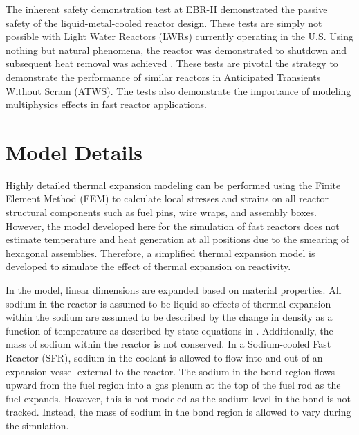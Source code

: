   The inherent safety demonstration test at EBR-II demonstrated the passive
  safety of the liquid-metal-cooled reactor design. These tests are simply not 
  possible with Light Water Reactors (LWRs) currently operating in the U.S. 
  Using nothing but natural phenomena, the reactor was demonstrated to shutdown 
  and subsequent heat removal was achieved \cite{ebriitests}. These tests are 
  pivotal the strategy to demonstrate the performance of similar reactors in 
  Anticipated Transients Without Scram (ATWS). The tests also demonstrate the 
  importance of modeling multiphysics effects in fast reactor applications.

\section{Model Details}
  \label{sec:model_details}
  Highly detailed thermal expansion modeling can be performed using the Finite
  Element Method (FEM) to calculate local stresses and strains on all reactor
  structural components such as fuel pins, wire wraps, and assembly boxes. 
  However, the model developed here for the simulation of
  fast reactors does not estimate temperature and heat generation at all 
  positions due to the smearing of hexagonal assemblies. Therefore, a simplified 
  thermal expansion model is developed to simulate the effect of thermal 
  expansion on reactivity.

  In the model, linear dimensions are expanded based on material properties.
  All sodium in the reactor is assumed to be liquid so effects of thermal
  expansion within the sodium are assumed to be described by the change in
  density as a function of temperature as described by state equations in
  \cite{sodiumProp}. Additionally, the mass of sodium within the reactor is not
  conserved. In a Sodium-cooled Fast Reactor (SFR), sodium in the coolant is 
  allowed to flow into and out of an expansion vessel external to the reactor.
  The sodium in the bond region flows upward from the fuel region into a gas 
  plenum at the top of the fuel rod as the fuel expands. However, this is not 
  modeled as the sodium level in the bond is not tracked. Instead, the mass of 
  sodium in the bond region is allowed to vary during the simulation.

